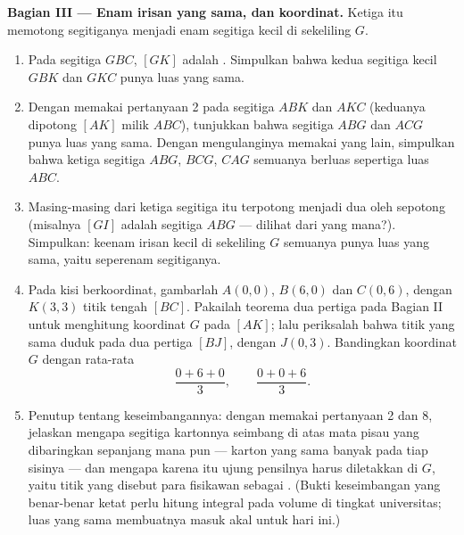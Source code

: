 \begin{problem}
\medskip
\noindent\textbf{Bagian III --- Enam irisan yang sama, dan koordinat.}
Ketiga  itu memotong segitiganya menjadi enam segitiga
kecil di sekeliling $G$.
\begin{enumerate}[resume]
  \item Pada segitiga $GBC$,  $[GK]$ adalah .
        Simpulkan bahwa kedua segitiga kecil $GBK$ dan $GKC$ punya
        luas yang sama.
  \item Dengan memakai pertanyaan 2 pada segitiga $ABK$ dan $AKC$
        (keduanya dipotong  $[AK]$ milik $ABC$),
        tunjukkan bahwa segitiga $ABG$ dan $ACG$ punya luas yang
        sama. Dengan mengulanginya memakai  yang lain,
        simpulkan bahwa ketiga segitiga
        $ABG$, $BCG$, $CAG$ semuanya berluas sepertiga luas $ABC$.
  \item Masing-masing dari ketiga segitiga itu terpotong menjadi dua
        oleh sepotong  (misalnya $[GI]$ adalah 
        segitiga $ABG$ --- dilihat dari  yang mana?).
        Simpulkan: keenam irisan kecil di sekeliling $G$ semuanya
        punya luas yang sama, yaitu seperenam segitiganya.
  \item Pada kisi berkoordinat, gambarlah $A(0, 0)$, $B(6, 0)$ dan
        $C(0, 6)$, dengan $K(3, 3)$ titik tengah $[BC]$. Pakailah
        teorema dua pertiga pada Bagian II untuk menghitung koordinat
        $G$ pada  $[AK]$; lalu periksalah bahwa titik yang
        sama duduk pada dua pertiga  $[BJ]$, dengan
        $J(0, 3)$. Bandingkan koordinat $G$ dengan rata-rata
        \[
        \frac{0 + 6 + 0}{3},
        \qquad
        \frac{0 + 0 + 6}{3} .
        \]
  \item Penutup tentang keseimbangannya: dengan memakai pertanyaan 2
        dan 8, jelaskan mengapa segitiga kartonnya seimbang di atas
        mata pisau yang dibaringkan sepanjang  mana pun
        --- karton yang sama banyak pada tiap sisinya --- dan
        mengapa karena itu ujung pensilnya harus diletakkan di $G$,
        yaitu titik yang disebut para fisikawan sebagai .
        (Bukti keseimbangan yang benar-benar ketat perlu hitung
        integral pada volume di tingkat universitas; luas yang sama
        membuatnya masuk akal untuk hari ini.)

\end{enumerate}
\end{problem}
